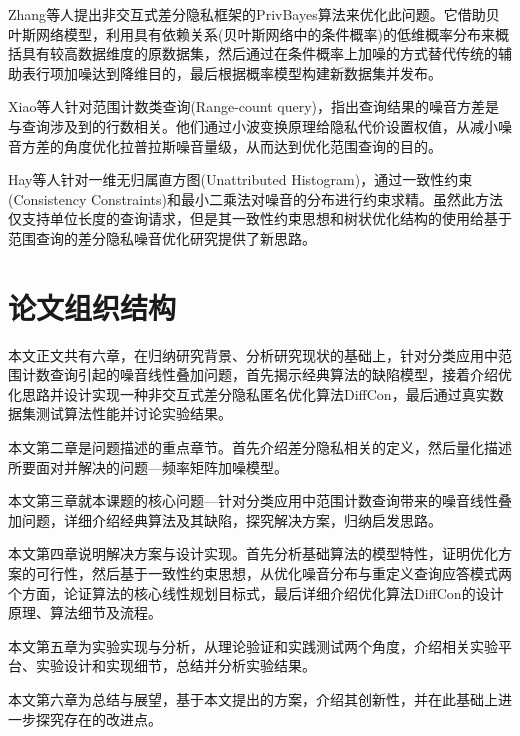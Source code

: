 Zhang\supercite{privbayes}等人提出非交互式差分隐私框架的PrivBayes算法来优化此问题。它借助贝叶斯网络模型，利用具有依赖关系(贝叶斯网络中的条件概率)的低维概率分布来概括具有较高数据维度的原数据集，然后通过在条件概率上加噪的方式替代传统的辅助表行项加噪达到降维目的，最后根据概率模型构建新数据集并发布。

Xiao\supercite{wavelet}等人针对范围计数类查询(Range-count query)，指出查询结果的噪音方差是与查询涉及到的行数相关。他们通过小波变换原理给隐私代价设置权值，从减小噪音方差的角度优化拉普拉斯噪音量级，从而达到优化范围查询的目的。

Hay\supercite{boosting}等人针对一维无归属直方图(Unattributed Histogram)，通过一致性约束(Consistency Constraints)和最小二乘法对噪音的分布进行约束求精。虽然此方法仅支持单位长度的查询请求，但是其一致性约束思想和树状优化结构的使用给基于范围查询的差分隐私噪音优化研究提供了新思路。

\section{论文组织结构}

本文正文共有六章，在归纳研究背景、分析研究现状的基础上，针对分类应用中范围计数查询引起的噪音线性叠加问题，首先揭示经典算法的缺陷模型，接着介绍优化思路并设计实现一种非交互式差分隐私匿名优化算法DiffCon，最后通过真实数据集测试算法性能并讨论实验结果。

本文第二章是问题描述的重点章节。首先介绍差分隐私相关的定义，然后量化描述所要面对并解决的问题---频率矩阵加噪模型。

本文第三章就本课题的核心问题---针对分类应用中范围计数查询带来的噪音线性叠加问题，详细介绍经典算法及其缺陷，探究解决方案，归纳启发思路。

本文第四章说明解决方案与设计实现。首先分析基础算法的模型特性，证明优化方案的可行性，然后基于一致性约束思想，从优化噪音分布与重定义查询应答模式两个方面，论证算法的核心线性规划目标式，最后详细介绍优化算法DiffCon的设计原理、算法细节及流程。

本文第五章为实验实现与分析，从理论验证和实践测试两个角度，介绍相关实验平台、实验设计和实现细节，总结并分析实验结果。

本文第六章为总结与展望，基于本文提出的方案，介绍其创新性，并在此基础上进一步探究存在的改进点。